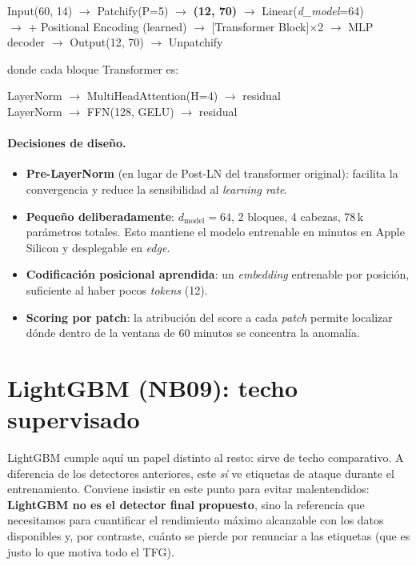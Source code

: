 \begin{center}
\textsf{Input(60, 14)} $\to$ Patchify(P=5) $\to$ \textbf{(12, 70)} $\to$ Linear(\textit{d\_model}=64) \\
$\to$ + Positional Encoding (learned) $\to$ [Transformer Block]$\times$2 $\to$ MLP decoder $\to$ Output(12, 70) $\to$ Unpatchify
\end{center}

donde cada bloque Transformer es:
\begin{center}
LayerNorm $\to$ MultiHeadAttention(H=4) $\to$ residual \\
LayerNorm $\to$ FFN(128, GELU) $\to$ residual
\end{center}

\paragraph{Decisiones de diseño.}
\begin{itemize}[leftmargin=*,topsep=0pt]
  \item \textbf{Pre-LayerNorm} (en lugar de Post-LN del transformer original): facilita la convergencia y reduce la sensibilidad al \emph{learning rate}.
  \item \textbf{Pequeño deliberadamente}: $d_{\mathrm{model}}=64$, 2 bloques, 4 cabezas, 78\,k parámetros totales. Esto mantiene el modelo entrenable en minutos en Apple Silicon y desplegable en \textit{edge}.
  \item \textbf{Codificación posicional aprendida}: un \textit{embedding} entrenable por posición, suficiente al haber pocos \textit{tokens} (12).
  \item \textbf{Scoring por patch}: la atribución del score a cada \emph{patch} permite localizar dónde dentro de la ventana de 60 minutos se concentra la anomalía.
\end{itemize}

\section{LightGBM (NB09): techo supervisado}
\label{sec:nb09}

LightGBM cumple aquí un papel distinto al resto: sirve de techo comparativo. A diferencia de los detectores anteriores, este \textit{sí} ve etiquetas de ataque durante el entrenamiento. Conviene insistir en este punto para evitar malentendidos: \textbf{LightGBM no es el detector final propuesto}, sino la referencia que necesitamos para cuantificar el rendimiento máximo alcanzable con los datos disponibles y, por contraste, cuánto se pierde por renunciar a las etiquetas (que es justo lo que motiva todo el TFG).

